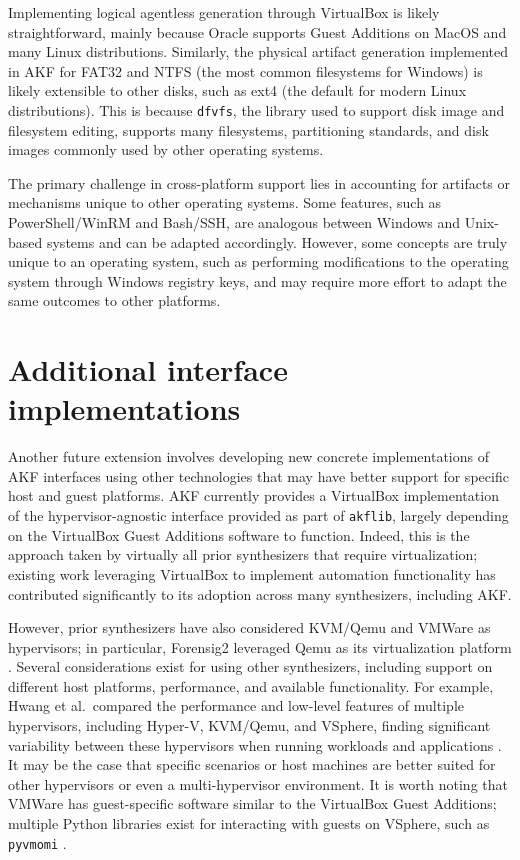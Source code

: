 \documentclass[letterpaper,12pt]{report}
\newcommand{\passthrough}[1]{#1}
\begin{document}
Implementing logical agentless generation through VirtualBox is likely
straightforward, mainly because Oracle supports Guest Additions on MacOS
and many Linux distributions. Similarly, the physical artifact
generation implemented in AKF for FAT32 and NTFS (the most common
filesystems for Windows) is likely extensible to other disks, such as
ext4 (the default for modern Linux distributions). This is because
\passthrough{\lstinline!dfvfs!}, the library used to support disk image
and filesystem editing, supports many filesystems, partitioning
standards, and disk images commonly used by other operating systems.

The primary challenge in cross-platform support lies in accounting for
artifacts or mechanisms unique to other operating systems. Some
features, such as PowerShell/WinRM and Bash/SSH, are analogous between
Windows and Unix-based systems and can be adapted accordingly. However,
some concepts are truly unique to an operating system, such as
performing modifications to the operating system through Windows
registry keys, and may require more effort to adapt the same outcomes to
other platforms.

\section{Additional interface
implementations}\label{additional-interface-implementations}

Another future extension involves developing new concrete
implementations of AKF interfaces using other technologies that may have
better support for specific host and guest platforms. AKF currently
provides a VirtualBox implementation of the hypervisor-agnostic
interface provided as part of \passthrough{\lstinline!akflib!}, largely
depending on the VirtualBox Guest Additions software to function.
Indeed, this is the approach taken by virtually all prior synthesizers
that require virtualization; existing work leveraging VirtualBox to
implement automation functionality has contributed significantly to its
adoption across many synthesizers, including AKF.

However, prior synthesizers have also considered KVM/Qemu and VMWare as
hypervisors; in particular, Forensig2 leveraged Qemu as its
virtualization platform \cite{mochForensicImageGenerator2009}.
Several considerations exist for using other synthesizers, including
support on different host platforms, performance, and available
functionality. For example, Hwang et al.~compared the performance and
low-level features of multiple hypervisors, including Hyper-V, KVM/Qemu,
and VSphere, finding significant variability between these hypervisors
when running workloads and applications
\cite{hwangComponentbasedPerformanceComparison2013}. It may be the
case that specific scenarios or host machines are better suited for
other hypervisors or even a multi-hypervisor environment. It is worth
noting that VMWare has guest-specific software similar to the VirtualBox
Guest Additions; multiple Python libraries exist for interacting with
guests on VSphere, such as \passthrough{\lstinline!pyvmomi!}
\cite{VmwarePyvmomi2025}.
\end{document}
